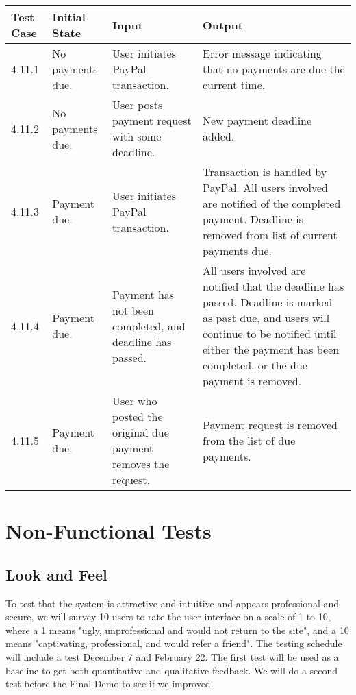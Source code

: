 \documentclass[12pt]{article}
\begin{document}
\begin{longtable}{|p{2cm}|p{3cm}|p{5cm}|p{5cm}|}
\hline
\textbf{Test Case} & \textbf{Initial State} & \textbf{Input} & \textbf{Output} \\ \hline
4.11.1 & No payments due. & User initiates PayPal transaction. & Error message indicating that no payments are due the current time.\\
\hline
4.11.2 & No payments due. & User posts payment request with some deadline. & New payment deadline added.\\
\hline
4.11.3 & Payment due. & User initiates PayPal transaction. & Transaction is handled by PayPal. All users involved are notified of the completed payment. Deadline is removed from list of current payments due.\\
\hline
4.11.4 & Payment due. & Payment has not been completed, and deadline has passed. & All users involved are notified that the deadline has passed. Deadline is marked as past due, and users will continue to be notified until either the payment has been completed, or the due payment is removed.\\
\hline
4.11.5 & Payment due. & User who posted the original due payment removes the request. & Payment request is removed from the list of due payments.\\
\hline
\end{longtable}


\section{Non-Functional Tests}

\subsection{Look and Feel}
To test that the system is attractive and intuitive and appears professional and secure, we will survey 10 users to rate the user interface on a scale of 1 to 10, where a 1 means "ugly, unprofessional and would not return to the site", and a 10 means "captivating, professional, and would refer a friend". The testing schedule will include a test December 7 and February 22. The first test will be used as a baseline to get both quantitative and qualitative feedback. We will do a second test before the Final Demo to see if we improved.
\end{document}
